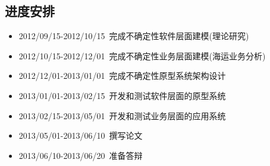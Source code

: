 \subsection{进度安排}
\begin{itemize}
    \item 2012/09/15-2012/10/15~完成不确定性软件层面建模(理论研究)
    \item 2012/10/15-2012/12/01~完成不确定性业务层面建模(海运业务分析)
    \item 2012/12/01-2013/01/01~完成不确定性原型系统架构设计
    \item 2013/01/01-2013/02/15~开发和测试软件层面的原型系统
    \item 2013/02/15-2013/05/01~开发和测试业务层面的应用系统
    \item 2013/05/01-2013/06/10~撰写论文
    \item 2013/06/10-2013/06/20~准备答辩
\end{itemize}


